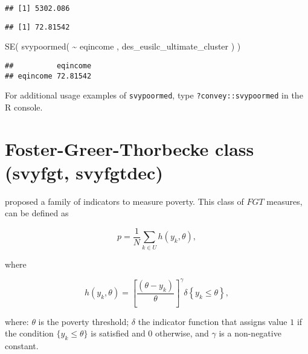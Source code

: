 \documentclass[
]{book}
\newenvironment{Shaded}{\begin{snugshade}}{\end{snugshade}}
\newcommand{\CommentTok}[1]{\textcolor[rgb]{0.56,0.35,0.01}{\textit{#1}}}
\newcommand{\FunctionTok}[1]{\textcolor[rgb]{0.00,0.00,0.00}{#1}}
\newcommand{\NormalTok}[1]{#1}
\newcommand{\SpecialCharTok}[1]{\textcolor[rgb]{0.00,0.00,0.00}{#1}}
\begin{document}
\begin{verbatim}
## [1] 5302.086
\end{verbatim}

\begin{Shaded}
\end{Shaded}

\begin{verbatim}
## [1] 72.81542
\end{verbatim}

\begin{Shaded}
\begin{Highlighting}[]
\FunctionTok{SE}\NormalTok{( }\FunctionTok{svypoormed}\NormalTok{( }\SpecialCharTok{\textasciitilde{}}\NormalTok{ eqincome , des\_eusilc\_ultimate\_cluster ) )}
\end{Highlighting}
\end{Shaded}

\begin{verbatim}
##          eqincome
## eqincome 72.81542
\end{verbatim}

For additional usage examples of \texttt{svypoormed}, type \texttt{?convey::svypoormed} in the R console.

\hypertarget{foster-greer-thorbecke-class-svyfgt-svyfgtdec}{%
\section{Foster-Greer-Thorbecke class (svyfgt, svyfgtdec)}\label{foster-greer-thorbecke-class-svyfgt-svyfgtdec}}

\textcite{foster1984} proposed a family of indicators to measure poverty. This class of \(FGT\) measures, can be defined as

\[
p=\frac{1}{N}\sum_{k\in U}h(y_{k},\theta ), 
\]

where

\[
h(y_{k},\theta )=\left[ \frac{(\theta -y_{k})}{\theta }\right] ^{\gamma
}\delta \left\{ y_{k}\leq \theta \right\} , 
\]

where: \(\theta\) is the poverty threshold; \(\delta\) the indicator function that assigns value \(1\) if the condition \(\{y_{k}\leq \theta \}\) is satisfied and \(0\) otherwise, and \(\gamma\) is a non-negative constant.
\end{document}
